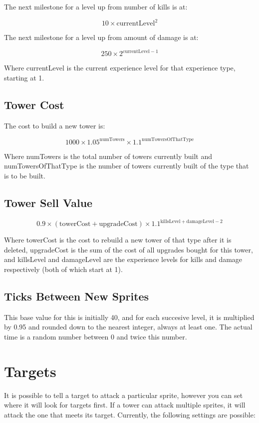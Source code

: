 \documentclass[a4paper,11pt]{article}
\begin{document}
The next milestone for a level up from number of kills is at:

\[10 \times \mathrm{currentLevel}^2\]

The next milestone for a level up from amount of damage is at:

\[250 \times 2^{\mathrm{currentLevel} - 1}\]

Where currentLevel is the current experience level for that experience type, starting at 1.

\subsection{Tower Cost}

The cost to build a new tower is:

\[1000 \times 1.05^{\mathrm{numTowers}} \times 1.1^{\mathrm{numTowersOfThatType}}\]

Where numTowers is the total number of towers currently built and numTowersOfThatType is the number of towers currently built of the type that is to be built.

\subsection{Tower Sell Value}

\[ 0.9 \times \left( \mathrm{towerCost + upgradeCost} \right) \times 1.1^{\mathrm{killsLevel + damageLevel} - 2}\]

Where towerCost is the cost to rebuild a new tower of that type after it is deleted, upgradeCost is the sum of the cost of all upgrades bought for this tower, and killsLevel and damageLevel are the experience levels for kills and damage respectively (both of which start at 1).

\subsection{Ticks Between New Sprites}

This base value for this is initially 40, and for each succesive level, it is multiplied by 0.95 and rounded down to the nearest integer, always at least one. The actual time is a random number between 0 and twice this number.

\section{Targets}
It is possible to tell a target to attack a particular sprite, however you can set where it will look for targets first. If a tower can attack multiple sprites, it will attack the one that meets its target. Currently, the following settings are possible:
\end{document}
